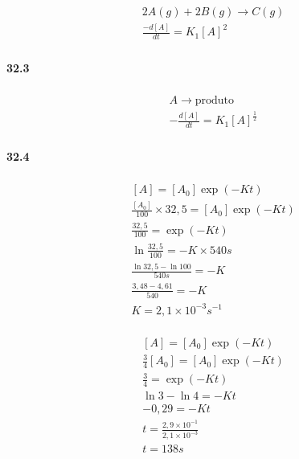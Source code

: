 \begin{gather}
    \begin{align}
        & 2A(g) + 2B(g) \rightarrow C(g) \\
        & \frac{-d[A]}{dt} = K_1[A]^2
    \end{align}
\end{gather}

\paragraph*{32.3}

\begin{gather}
    \begin{align}
        & A \rightarrow \text{produto} \\
        & -\frac{d[A]}{dt} = K_1 [A]^{\frac{1}{2}}
    \end{align}
\end{gather}

\paragraph*{32.4}

\begin{gather}
    \begin{align}
        & [A] = [A_0] \exp(-Kt) \\
        & \frac{[A_0]}{100} \times 32,5 = [A_0] \exp(-Kt) \\
        & \frac{32,5}{100} = \exp(-Kt) \\
        & \ln \frac{32,5}{100} = -K \times 540s \\
        & \frac{\ln 32,5 - \ln 100}{540s} = -K \\
        & \frac{3,48 - 4,61}{540} = -K \\
        & K = 2,1 \times 10^{-3} s^{-1}
    \end{align}
\end{gather}

\begin{gather}
    \begin{align}
        & [A] = [A_0] \exp(-Kt) \\
        & \frac{3}{4} [A_0] = [A_0] \exp(-Kt) \\
        & \frac{3}{4} = \exp(-Kt) \\
        & \ln 3 - \ln 4 = -Kt \\
        & -0,29 = -Kt \\
        & t = \frac{2,9 \times 10^{-1}}{2,1 \times 10^{-3}} \\
        & t = 138s
    \end{align}
\end{gather}

